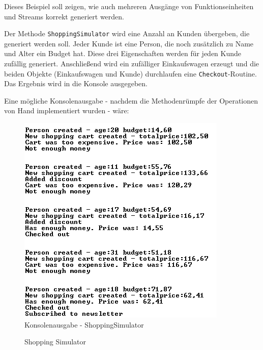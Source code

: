 Dieses Beispiel soll zeigen, wie auch mehreren Ausgänge von Funktionseinheiten und Streams korrekt generiert werden.

Der Methode \texttt{ShoppingSimulator} wird eine Anzahl an Kunden übergeben, die generiert werden soll.
Jeder Kunde ist eine Person, die noch zusätzlich zu Name und Alter ein Budget hat.
Diese drei Eigenschaften werden für jeden Kunde zufällig generiert.
Anschließend wird ein zufälliger Einkaufswagen erzeugt und die beiden Objekte (Einkaufswagen und Kunde) durchlaufen eine \texttt{Checkout}-Routine.
Das Ergebnis wird in die Konsole ausgegeben.

Eine mögliche Konsolenausgabe - nachdem die Methodenrümpfe der Operationen von Hand implementiert wurden - wäre:
\begin{figure}[H]
	\centering
	\includegraphics[width=0.6\linewidth]{./img/ShoppingSimulator_result.png}
	\caption{Konsolenausgabe - ShoppingSimulator}
\end{figure}



\begin{landscape}
	\begin{figure}
		\thispagestyle{empty}
		\vspace*{-1.5cm}
		
		\caption{Shopping Simulator}
	\end{figure}
\end{landscape}




